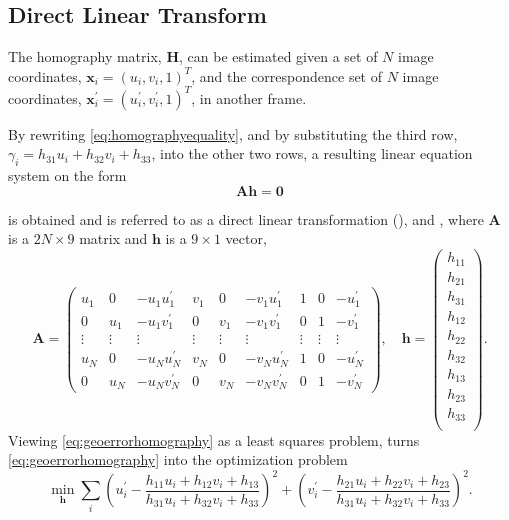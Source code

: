 \subsection{Direct Linear Transform}
The homography matrix, $\bm{H}$, can be estimated given a set of $N$ image coordinates, $\bm{x}_i = (u_i, v_i, 1)^T$, and the correspondence set of $N$ image coordinates, $\bm{x}^\prime_i = (u^\prime_i, v^\prime_i, 1)^T$, in another frame.

By rewriting \eqref{eq:homographyequality}, and by substituting the third row, $\gamma_i = h_{31}u_i + h_{32}v_i + h_{33}$, into the other two rows, a resulting linear equation system on the form
%
\begin{equation}
	\label{eq:geoerrorhomography}
	\bm{A} \bm{h} = \bm{0}
\end{equation}

\vspace{1em}

is obtained and is referred to as a direct linear transformation (\abbrDLT), \eg \cite{Hartley:2004} and \cite{Nordberg:2015}, where $\bm{A}$ is a $2 N \times 9$ matrix and $\bm{h}$ is a $9 \times 1$ vector,
%
\begin{equation}
	\bm{A} =
	\begin{pmatrix}
		u_1 & 0 & -u_1 u_1^\prime & v_1 & 0 & - v_1 u_1^\prime & 1 & 0 & -u_1^\prime \\
		0 & u_1 & -u_1 v_1^\prime & 0 & v_1 & - v_1 v_1^\prime & 0 & 1 & -v_1^\prime \\
		\vdots & \vdots & \vdots & \vdots & \vdots & \vdots & \vdots & \vdots & \vdots \\
		u_N & 0 & -u_N u_N^\prime & v_N & 0 & - v_N u_N^\prime & 1 & 0 & -u_N^\prime \\
		0 & u_N & -u_N v_N^\prime & 0 & v_N & - v_N v_N^\prime & 0 & 1 & -v_N^\prime
	\end{pmatrix}
	,
	\quad
	\bm{h} =
	\begin{pmatrix}
		h_{11} \\
		h_{21} \\
		h_{31} \\
		h_{12} \\
		h_{22} \\
		h_{32} \\
		h_{13} \\
		h_{23} \\
		h_{33} \\
	\end{pmatrix}
	.
\end{equation}
%
Viewing \eqref{eq:geoerrorhomography} as a least squares problem, turns \eqref{eq:geoerrorhomography} into the optimization problem
%
\begin{equation}
	\min_{\bm{h}} \sum_i
	\left( u^\prime_i - \frac{h_{11}u_i + h_{12}v_i + h_{13}}{h_{31}u_i + h_{32}v_i + h_{33}} \right)^2 +
	\left( v^\prime_i - \frac{h_{21}u_i + h_{22}v_i + h_{23}}{h_{31}u_i + h_{32}v_i + h_{33}} \right)^2.
\end{equation}

